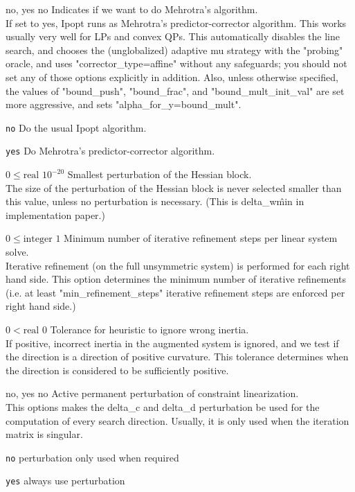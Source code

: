 %
{\ttfamily no, yes}%
{no}%
{Indicates if we want to do Mehrotra's algorithm.\\
If set to yes, Ipopt runs as Mehrotra's predictor-corrector algorithm. This works usually very well for LPs and convex QPs.  This automatically disables the line search, and chooses the (unglobalized) adaptive mu strategy with the "probing" oracle, and uses "corrector\_type=affine" without any safeguards; you should not set any of those options explicitly in addition.  Also, unless otherwise specified, the values of "bound\_push", "bound\_frac", and "bound\_mult\_init\_val" are set more aggressive, and sets "alpha\_for\_y=bound\_mult".}%
{\begin{list}{}{
\setlength{\parsep}{0em}
\setlength{\leftmargin}{5ex}
\setlength{\labelwidth}{2ex}
\setlength{\itemindent}{0ex}
\setlength{\topsep}{0pt}}
\item[\texttt{no}] Do the usual Ipopt algorithm.
\item[\texttt{yes}] Do Mehrotra's predictor-corrector algorithm.
\end{list}
}

%
{$0\leq\textrm{real}$}%
{$10^{-20}$}%
{Smallest perturbation of the Hessian block.\\
The size of the perturbation of the Hessian block is never selected smaller than this value, unless no perturbation is necessary. (This is delta\_w\^min in implementation paper.)}%
{}

%
{$0\leq\textrm{integer}$}%
{$1$}%
{Minimum number of iterative refinement steps per linear system solve.\\
Iterative refinement (on the full unsymmetric system) is performed for each right hand side.  This option determines the minimum number of iterative refinements (i.e. at least "min\_refinement\_steps" iterative refinement steps are enforced per right hand side.)}%
{}

%
{$0<\textrm{real}$}%
{$0$}%
{Tolerance for heuristic to ignore wrong inertia.\\
If positive, incorrect inertia in the augmented system is ignored, and we test if the direction is a direction of positive curvature.  This tolerance determines when the direction is considered to be sufficiently positive.}%
{}

%
{\ttfamily no, yes}%
{no}%
{Active permanent perturbation of constraint linearization.\\
This options makes the delta\_c and delta\_d perturbation be used for the computation of every search direction.  Usually, it is only used when the iteration matrix is singular.}%
{\begin{list}{}{
\setlength{\parsep}{0em}
\setlength{\leftmargin}{5ex}
\setlength{\labelwidth}{2ex}
\setlength{\itemindent}{0ex}
\setlength{\topsep}{0pt}}
\item[\texttt{no}] perturbation only used when required
\item[\texttt{yes}] always use perturbation
\end{list}
}

